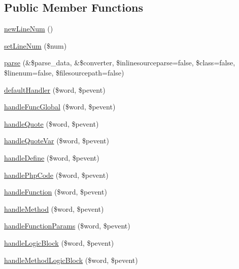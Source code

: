 \subsection*{\-Public \-Member \-Functions}
\begin{DoxyCompactItemize}
\item 
\hyperlink{classphp_documentor___highlight_parser_a0aa5ad6874d7cb5842fb75d9d9edd1cc}{new\-Line\-Num} ()
\item 
\hyperlink{classphp_documentor___highlight_parser_a855be7133354603f9f7f33da66ec5a30}{set\-Line\-Num} (\$num)
\item 
\hyperlink{classphp_documentor___highlight_parser_af2c58a5bc9af02e3e44df13fdae1d375}{parse} (\&\$parse\-\_\-data, \&\$converter, \$inlinesourceparse=false, \$class=false, \$linenum=false, \$filesourcepath=false)
\item 
\hyperlink{classphp_documentor___highlight_parser_a4d5d6de1bd28d678fdca6e4d5e0076b0}{default\-Handler} (\$word, \$pevent)
\item 
\hyperlink{classphp_documentor___highlight_parser_aeea50ac4c19702902041fa4c7886efdd}{handle\-Func\-Global} (\$word, \$pevent)
\item 
\hyperlink{classphp_documentor___highlight_parser_a4ba20cc549548714f50dafced3b6ec71}{handle\-Quote} (\$word, \$pevent)
\item 
\hyperlink{classphp_documentor___highlight_parser_a9e564abb2302695638d5c1d3f2ff9acb}{handle\-Quote\-Var} (\$word, \$pevent)
\item 
\hyperlink{classphp_documentor___highlight_parser_a1769290b6b18b684616582c0db6bd0dd}{handle\-Define} (\$word, \$pevent)
\item 
\hyperlink{classphp_documentor___highlight_parser_a08a1dde387562480e8030e16e8472548}{handle\-Php\-Code} (\$word, \$pevent)
\item 
\hyperlink{classphp_documentor___highlight_parser_a6dc39d8d613058ad93f476e91fdb7cf3}{handle\-Function} (\$word, \$pevent)
\item 
\hyperlink{classphp_documentor___highlight_parser_ac0835c9fb454181bc476d01f2613e8ca}{handle\-Method} (\$word, \$pevent)
\item 
\hyperlink{classphp_documentor___highlight_parser_aabdf4a71f7610ba56a173ea10c5f541b}{handle\-Function\-Params} (\$word, \$pevent)
\item 
\hyperlink{classphp_documentor___highlight_parser_a74750f3abb8dc11a29a566b51c414370}{handle\-Logic\-Block} (\$word, \$pevent)
\item 
\hyperlink{classphp_documentor___highlight_parser_ac126f11f9681bc8d9757cb357afbb6c0}{handle\-Method\-Logic\-Block} (\$word, \$pevent)

\end{DoxyCompactItemize}
